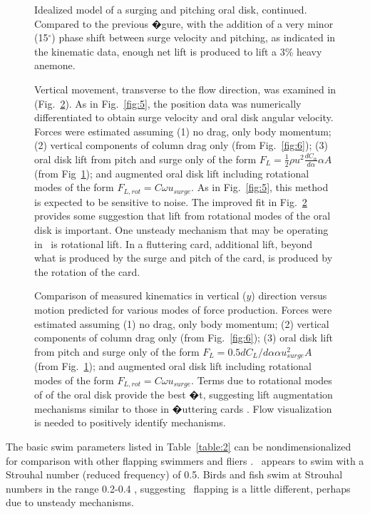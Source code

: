 \documentclass{jeb}
\newcommand{\Stomphia}{\Genus{S. coccinea}}
\begin{document}
\begin{figure}
\caption{Idealized model of a surging and pitching oral disk, continued.  Compared to the previous �gure, with the addition of a very minor (15$^{\circ}$) phase shift between surge velocity and pitching, as indicated in the kinematic data, enough net lift is produced to lift a 3\% heavy anemone. }
\label{fig:8}
\end{figure}
\begin{figure}
	
Vertical movement, transverse to the flow direction, was examined in (Fig.~\ref{fig:9}). As in Fig.~\ref{fig:5}, the position data was numerically differentiated to obtain surge velocity and oral disk angular velocity.  Forces were estimated assuming (1) no drag, only body momentum; (2) vertical components of column drag only (from Fig.~\ref{fig:6}); (3) oral disk lift from pitch and surge only of the form $F_L = \frac{1}{2}\rho u^2 \frac{dC_\alpha}{d\alpha}\alpha  A$ (from Fig~\ref{fig:8}); and augmented oral disk lift including rotational modes of the form $F_{L,rot} = C \omega u_{surge}$. As in Fig.~\ref{fig:5}, this method is expected to be sensitive to noise.  The improved fit in Fig.~\ref{fig:9} provides some suggestion that lift from rotational modes of the oral disk is important. One unsteady mechanism that may be operating in \Stomphia\ is rotational lift.  In a fluttering card, additional lift, beyond what is produced by the surge and pitch of the card, is produced by the rotation of the card.

\caption{Comparison of measured kinematics in vertical ($y$) direction versus motion predicted for various modes of force production.  Forces were estimated assuming (1) no drag, only body momentum; (2) vertical components of column drag only (from Fig.~\ref{fig:6}); (3) oral disk lift from pitch and surge only of the form $F_L = 0.5 dC_L/d\alpha \alpha u_{surge}^2 A$ (from Fig.~\ref{fig:8}); and augmented oral disk lift including rotational modes of the form $F_{L,rot} = C\omega u_{surge}$.  Terms due to rotational modes of of the oral disk provide the best �t, suggesting lift augmentation mechanisms similar to those in �uttering cards \citep{Pesavento:2004, Andersen:2005a, Andersen:2005}.  Flow visualization is needed to positively identify  mechanisms.}
\label{fig:9}
\end{figure}
 	
The basic swim parameters listed in Table~\ref{table:2} can be nondimensionalized for comparison with other flapping swimmers and fliers \citep{Taylor:2003}.  \Stomphia\ appears to swim with a Strouhal number (reduced frequency) of 0.5.  Birds and fish swim at Strouhal numbers in the range 0.2-0.4 \citep{Taylor:2003}, suggesting \Stomphia\ flapping is a little different, perhaps due to unsteady mechanisms.
	  
\end{document}
